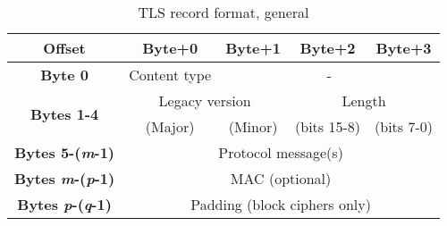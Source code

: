 \documentclass[11pt]{scrartcl} %
\begin{document}
\begin{table}[htbp]
	\centering
	\caption{TLS record format, general}
	\begin{tabular}{|c|c|c|c|c|}
	\hline
	\textbf{Offset} & \textbf{Byte+0} & \textbf{Byte+1} & \textbf{Byte+2} & \textbf{Byte+3} \\ \hline
	\textbf{Byte 0} & Content type & \multicolumn{3}{c|}{-} \\ \hline
	\multirow{2}{*}{\textbf{Bytes 1-4}} & \multicolumn{2}{c|}{Legacy version} & \multicolumn{2}{c|}{Length} \\ \cline{2-5} 
	 & (Major) & (Minor) & (bits 15-8) & (bits 7-0) \\ \hline
	\textbf{Bytes 5-(\textit{m}-1)} & \multicolumn{4}{c|}{Protocol message(s)} \\ \hline
	\textbf{Bytes \textit{m}-(\textit{p}-1)} & \multicolumn{4}{c|}{MAC (optional)} \\ \hline
	\textbf{Bytes \textit{p}-(\textit{q}-1)} & \multicolumn{4}{c|}{Padding (block ciphers only)} \\ \hline
	\end{tabular}
	\end{table}
	
	
	
\end{document}
